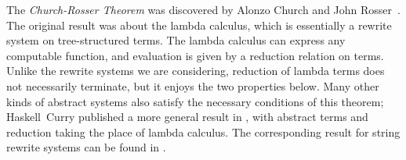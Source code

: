 \documentclass[../generics]{subfiles}
\begin{document}
The \emph{Church-Rosser Theorem} was discovered by Alonzo Church and John Rosser~\cite{conversion}. The original result was about the lambda calculus, which is essentially a rewrite system on tree-structured terms. The lambda calculus can express any computable function, and evaluation is given by a reduction relation on terms. Unlike the rewrite systems we are considering, reduction of lambda terms does not necessarily terminate, but it enjoys the two properties below. Many other kinds of abstract systems also satisfy the necessary conditions of this theorem; Haskell~Curry published a more general result in \cite{combinatory}, with abstract terms and reduction taking the place of lambda calculus. The corresponding result for string rewrite systems can be found in \cite{book2012string}.
\end{document}
